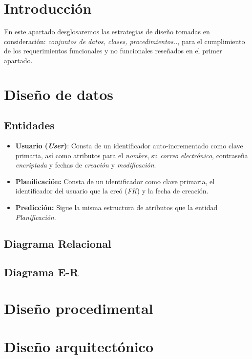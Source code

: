 
\section{Introducción}

En este apartado desglosaremos las estrategias de diseño tomadas en consideración: \textit{conjuntos de datos, clases, procedimientos..}, para el cumplimiento de los requerimientos funcionales y no funcionales reseñados en el primer apartado.

\section{Diseño de datos}

\subsection{Entidades}

\begin{itemize}
    \item \textbf{Usuario (\textit{User})}: Consta de un identificador auto-incrementado como clave primaria, así como atributos para el \textit{nombre}, su \textit{correo electrónico}, contraseña \textit{encriptada} y fechas de \textit{creación} y \textit{modificación}.
    \item \textbf{Planificación:} Consta de un identificador como clave primaria, el identificador del usuario que la creó (\textit{FK}) y la fecha de creación.
    \item \textbf{Predicción:} Sigue la misma estructura de atributos que la entidad \textit{Planificación}.
\end{itemize}

\newpage
\subsection{Diagrama Relacional}



\subsection{Diagrama E-R}


\newpage

\section{Diseño procedimental}

\section{Diseño arquitectónico}


